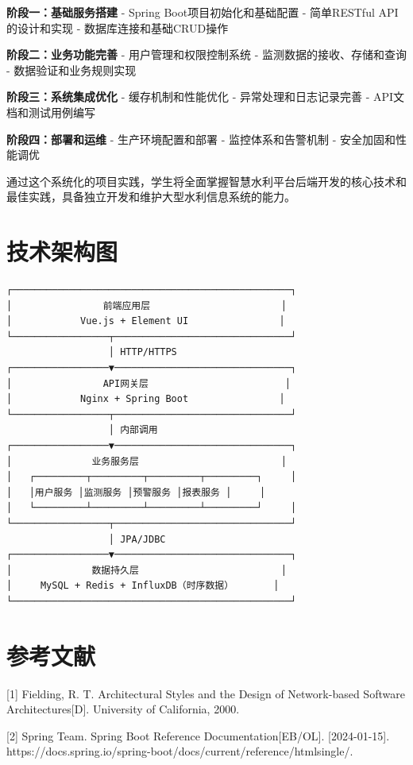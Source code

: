 \textbf{阶段一：基础服务搭建} - Spring Boot项目初始化和基础配置 - 简单RESTful API的设计和实现 - 数据库连接和基础CRUD操作

\textbf{阶段二：业务功能完善} - 用户管理和权限控制系统 - 监测数据的接收、存储和查询 - 数据验证和业务规则实现

\textbf{阶段三：系统集成优化} - 缓存机制和性能优化 - 异常处理和日志记录完善 - API文档和测试用例编写

\textbf{阶段四：部署和运维} - 生产环境配置和部署 - 监控体系和告警机制 - 安全加固和性能调优

通过这个系统化的项目实践，学生将全面掌握智慧水利平台后端开发的核心技术和最佳实践，具备独立开发和维护大型水利信息系统的能力。

\section{技术架构图}

\begin{lstlisting}
┌─────────────────────────────────────────────────┐
│                前端应用层                       │
│            Vue.js + Element UI                │
└─────────────────┬───────────────────────────────┘
                  │ HTTP/HTTPS
┌─────────────────▼───────────────────────────────┐
│                API网关层                        │
│            Nginx + Spring Boot                │
└─────────────────┬───────────────────────────────┘
                  │ 内部调用
┌─────────────────▼───────────────────────────────┐
│              业务服务层                         │
│   ┌─────────┬─────────┬─────────┬─────────┐     │
│   │用户服务 │监测服务 │预警服务 │报表服务 │     │
│   └─────────┴─────────┴─────────┴─────────┘     │
└─────────────────┬───────────────────────────────┘
                  │ JPA/JDBC
┌─────────────────▼───────────────────────────────┐
│              数据持久层                         │
│     MySQL + Redis + InfluxDB（时序数据）       │
└─────────────────────────────────────────────────┘
\end{lstlisting}

\section{参考文献}

{[}1{]} Fielding, R. T. Architectural Styles and the Design of Network-based Software Architectures{[}D{]}. University of California, 2000.

{[}2{]} Spring Team. Spring Boot Reference Documentation{[}EB/OL{]}. {[}2024-01-15{]}. https://docs.spring.io/spring-boot/docs/current/reference/htmlsingle/.

